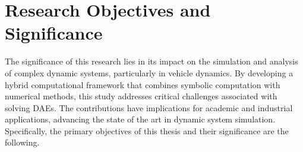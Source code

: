 
\section{Research Objectives and Significance}

The significance of this research lies in its impact on the simulation and analysis of complex dynamic systems, particularly in vehicle dynamics. By developing a hybrid computational framework that combines symbolic computation with numerical methods, this study addresses critical challenges associated with solving \acp{DAE}. The contributions have implications for academic and industrial applications, advancing the state of the art in dynamic system simulation. Specifically, the primary objectives of this thesis and their significance are the following.

